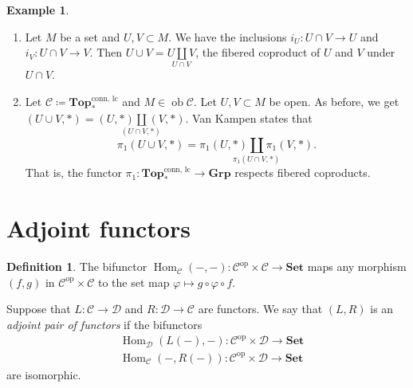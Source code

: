 \documentclass[10pt,letterpaper,cm]{nupset}
\theoremstyle{definition}
\newtheorem*{definition}{Definition}
\newtheorem{exmp}{Example}
\newcommand{\1}{\mathbf{1}}
\renewcommand{\c}{\mathscr{C}}
\renewcommand{\d}{\mathscr{D}}
\newcommand{\0}{\vec 0}
\DeclareMathOperator{\op}{op}
\DeclareMathOperator{\ob}{ob}
\DeclareMathOperator{\Hom}{Hom}
\begin{document}
\begin{exmp} $ $
\begin{enumerate}
\item Let $M$ be a set and $U, V\subset M$. We have the inclusions $i_U : U \cap V \to U$ and $i_V : U \cap V \to V$. Then $U \cup V = \underset{U \cap V}{U \coprod V}$, the fibered coproduct of $U$ and $V$ under $U \cap V$.
\item Let $\c \coloneqq  \mathbf{Top}_{\ast}^{\text{conn, lc}}$ and $M \in \ob \c$. Let $U, V \subset M$ be open. As before, we get $(U \cup V, \ast)= \underset{(U \cap V, {\ast})}{(U, \ast)  \coprod (V, \ast)} $. Van Kampen states that $$\pi_1(U \cup V, \ast) = \underset{\pi_1(U \cap V, \ast)}{\pi_1(U, \ast) \coprod \pi_1(V, \ast)}.$$ That is, the functor $\pi_1: \mathbf{Top}_{\ast}^{\text{conn, lc}}\to \mathbf{Grp}$ respects fibered coproducts. 
\end{enumerate}
\end{exmp}

\section{Adjoint functors}

\begin{definition}
The bifunctor $\Hom_{\c}({-}, {-}) : \c^{\op} \times \c \to \mathbf{Set}$ maps any morphism $(f, g)$ in $\c^{\op} \times \c$ to the set map $\varphi \mapsto g \circ \varphi \circ f$.

Suppose that $L: \c \to \d$ and $R: \d \to \c$ are functors. We say that $(L, R)$ is an \textit{adjoint pair of functors} if the bifunctors
\begin{align*}
& \Hom_{\d}(L(-), -) : \c^{\op} \times \d \to \mathbf{Set}
\\ & \Hom_{\c}(-, R(-)) : \c^{\op} \times \d \to \mathbf{Set} 
\end{align*}
are isomorphic.
\end{definition}
\end{document}
